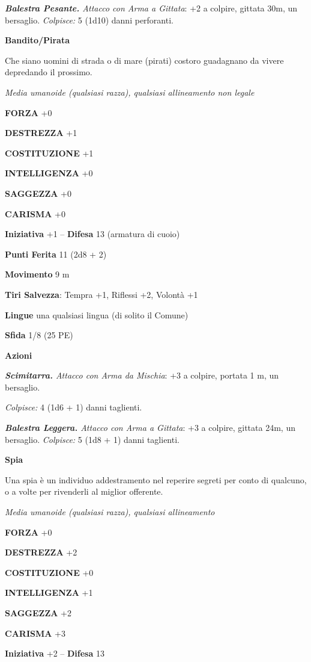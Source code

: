 \begin{multicols}{2}
\emph{\textbf{Balestra Pesante.} Attacco con Arma a Gittata}: +2 a colpire, gittata 30m, un bersaglio. \emph{Colpisce:} 5 (1d10) danni perforanti.

\medskip\textbf{Bandito/Pirata}

Che siano uomini di strada o di mare (pirati) costoro guadagnano da vivere depredando il prossimo.

\emph{Media umanoide (qualsiasi razza), qualsiasi allineamento non legale}

\textbf{FORZA} +0

\textbf{DESTREZZA} +1

\textbf{COSTITUZIONE} +1

\textbf{INTELLIGENZA} +0

\textbf{SAGGEZZA} +0

\textbf{CARISMA} +0

\textbf{Iniziativa} +1 -- \textbf{Difesa} 13 (armatura di cuoio)

\textbf{Punti Ferita} 11 (2d8 + 2)

\textbf{Movimento} 9 m

\textbf{Tiri Salvezza}: Tempra +1, Riflessi +2, Volontà +1 

\textbf{Lingue} una qualsiasi lingua (di solito il Comune)

\textbf{Sfida} 1/8 (25 PE)

\textbf{Azioni}

\emph{\textbf{Scimitarra.} Attacco con Arma da Mischia}: +3 a colpire, portata 1 m, un bersaglio.

\emph{Colpisce:} 4 (1d6 + 1) danni taglienti.

\emph{\textbf{Balestra Leggera.} Attacco con Arma a Gittata}: +3 a colpire, gittata 24m, un bersaglio. \emph{Colpisce:} 5 (1d8 + 1) danni taglienti.

\medskip\textbf{Spia}

Una spia è un individuo addestramento nel reperire segreti per conto di qualcuno, o a volte per rivenderli al miglior offerente.

\emph{Media umanoide (qualsiasi razza), qualsiasi allineamento}

\textbf{FORZA} +0

\textbf{DESTREZZA} +2

\textbf{COSTITUZIONE} +0

\textbf{INTELLIGENZA} +1

\textbf{SAGGEZZA} +2

\textbf{CARISMA} +3

\textbf{Iniziativa} +2 -- \textbf{Difesa} 13


\end{multicols}
